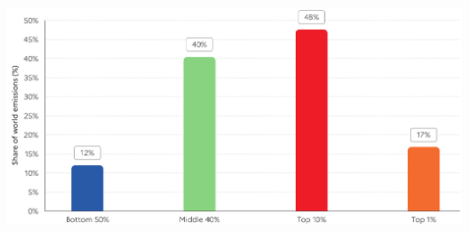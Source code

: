 \documentclass[9pt,handout,aspectratio=169]{beamer}
\begin{document}
\begin{frame}
\begin{scriptsize}
\begin{columns}
      \begin{center}
          \includegraphics[width=1.0\textwidth]{plots/WIR_budget.png}
      \end{center}
    \end{columns}

  \end{scriptsize}
  \end{frame}  
\end{document}
